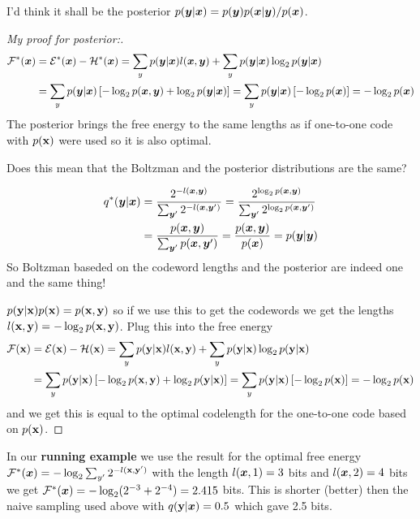 I'd think it shall be the posterior $p({\bm{y}} \vert {\bm{x}}) = p({\bm{y}})p({\bm{x}} | {\bm{y}}) / p({\bm{x}})$.

\begin{proof}[My proof for posterior:]
\begin{align*}
\mathcal{F^*}({\bm{x}}) & = \mathcal{E^*}({\bm{x}}) - \mathcal{H^*}({\bm{x}})
= \sum_y p({\bm{y}} | {\bm{x}}) l({\bm{x}}, {\bm{y}}) + \sum_y p({\bm{y}} | {\bm{x}}) \log_2 p({\bm{y}} | {\bm{x}}) \\
& = \sum_y p({\bm{y}} | {\bm{x}}) \left[- \log_2 p({\bm{x}}, {\bm{y}}) + \log_2 p({\bm{y}} | {\bm{x}})\right]
= \sum_y p({\bm{y}} | {\bm{x}}) \left[- \log_2 p({\bm{x}}) \right] = - \log_2 p({\bm{x}})
\end{align*}
The posterior brings the free energy to the same lengths as if one-to-one code with $p({\mathbf{x}})$ were used so it is also optimal.

\begin{notebox}
Does this mean that the Boltzman and the posterior distributions are the same?

\begin{align*}
q^*({\bm{y}} | {\bm{x}}) & = \frac{2^{-l({\bm{x}}, {\bm{y}})}}{\sum_{{\bm{y}}'} 2^{-l({\bm{x}}, {\bm{y}}')}}
= \frac{2^{\log_2 p({\bm{x}}, {\bm{y}})}}{\sum_{{\bm{y}}'} 2^{\log_2 p({\bm{x}}, {\bm{y}}')}} \nonumber \\
& = \frac{p({\bm{x}}, {\bm{y}})}{\sum_{{\bm{y}}'} p({\bm{x}}, {\bm{y}}')} = \frac{p({\bm{x}}, {\bm{y}})}{p({\bm{x}})} = p({\bm{y}} | {\bm{y}})
\end{align*}
So Boltzman baseded on the codeword lengths and the posterior are indeed one and the same thing!
\end{notebox}

$p({\mathbf{y}} \vert {\mathbf{x}}) p({\mathbf{x}}) = p({\mathbf{x}} , {\mathbf{y}})$ so if we use this to get the codewords we get the lengths $l({\mathbf{x}}, {\mathbf{y}}) = - \log_2 p({\mathbf{x}} , {\mathbf{y}})$.
Plug this into the free energy
\begin{align*}
\mathcal{F({\mathbf{x}})} & = \mathcal{E({\mathbf{x}})} - \mathcal{H({\mathbf{x}})} = \sum_y p({\mathbf{y}} | {\mathbf{x}}) l({\mathbf{x}}, {\mathbf{y}}) + \sum_y p({\mathbf{y}} | {\mathbf{x}}) \log_2 p({\mathbf{y}} | {\mathbf{x}}) \\
& = \sum_y p({\mathbf{y}} | {\mathbf{x}}) \left[- \log_2 p({\mathbf{x}}, {\mathbf{y}}) + \log_2 p({\mathbf{y}} | {\mathbf{x}})\right]
= \sum_y p({\mathbf{y}} | {\mathbf{x}}) \left[- \log_2 p({\mathbf{x}}) \right] = - \log_2 p({\mathbf{x}})
\end{align*}
and we get this is equal to the optimal codelength for the one-to-one code based on $p({\mathbf{x}})$.
\end{proof}

In our \textbf{running example} we use the result for the optimal free energy
$\mathcal{F^*}({\bm{x}}) = - \log_2 \sum_{y'} 2^{-l({\mathbf{x}}, {\mathbf{y}}')}$ with the length
$l({\bm{x}}, 1) = 3$ bits and $l({\bm{x}}, 2) = 4$ bits we get
$\mathcal{F^*}({\bm{x}}) = - \log_2 (2^{-3} + 2^{-4}) = 2.415$ bits.
This is shorter (better) then the naive sampling used above with $q({\mathbf{y}} | {\bm{x}}) = 0.5$ which gave 2.5 bits.


